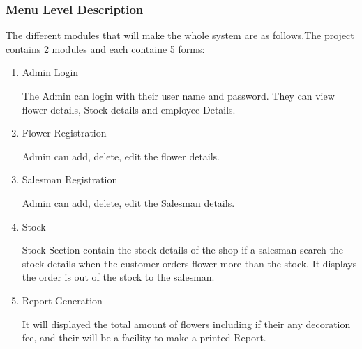 \documentclass[a4paper,12pt]{article}
\begin{document}
\subsubsection{Menu Level Description}
 The different modules that will make the whole system are as follows.The project contains 2 modules and each containe 5 forms:\vspace{2mm}
\begin{enumerate}
\item{Admin Login }\par\vspace{2mm}
The Admin can login with their user name and password. They can view flower details, Stock details and employee Details.
\item{Flower Registration }\par\vspace{2mm}
Admin  can add, delete, edit the flower details.

\item{Salesman Registration }\par\vspace{2mm}
Admin  can add, delete, edit the Salesman details.

\item{Stock }\par\vspace{2mm}
 Stock Section contain the stock details of the shop if a salesman search the stock details when the customer orders flower more than the stock. It displays the order is out of the stock to the salesman.

\item{Report Generation }\par\vspace{2mm}
It will displayed the total amount of flowers including if their any decoration fee, and their will be a facility to make a printed Report.

\end{enumerate}
\newpage
\end{document}
